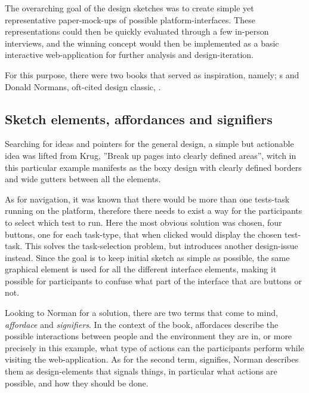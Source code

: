 {	The overarching goal of the design sketches was to create simple yet
	representative paper-mock-ups of possible platform-interfaces. These
	representations  could then be quickly evaluated through a few in-person
	interviews, and the winning concept would then be implemented as a basic
	interactive web-application for further analysis and design-iteration.

	For this purpose, there were two books that served as inspiration, namely;
	\citeauthor{citeDonMakeMeThink}s
	\cite{citeDonMakeMeThink} and Donald Normans,
	oft-cited design classic,
	\cite{citeTheDesignOfEverydayThings}.

	\subsection{Sketch elements, affordances and signifiers}

	Searching for ideas and pointers for the general design, a simple but
	actionable idea was lifted from Krug, ''Break up pages into clearly defined
	areas'', witch in this particular example manifests as the boxy design with
	clearly defined borders and wide gutters between all the elements.

  As for navigation, it was known that there would be more than one tests-task
  running on the platform, therefore there needs to exist a way for the
  participants to select which test to run. Here the most obvious solution was
  chosen, four buttons, one for each task-type, that when clicked would display
  the chosen test-task. This solves the task-selection problem, but introduces
  another design-issue instead. Since the goal is to keep initial sketch as
  simple as possible, the same graphical element is used for all the different
  interface elements, making it possible for participants to confuse what part
  of the interface that are buttons or not.

	Looking to Norman for a solution, there are two terms that come to mind,
	\textit{affordace} and \textit{signifiers}. In the context of the book,
	affordaces describe the possible interactions between people and the
	environment they are in, or more precisely in this example, what type of
	actions can the participants perform while visiting the web-application. As
	for the second term, signifies, Norman describes them as design-elements that
	signals things, in particular what actions are possible, and how they should
	be done.

}
